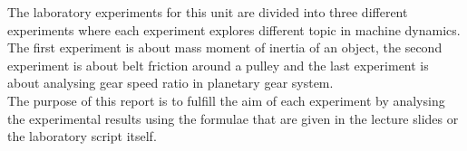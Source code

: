 The laboratory experiments for this unit are divided into three different experiments where each experiment explores different topic in machine dynamics. The first experiment is about mass moment of inertia of an object, the second experiment is about belt friction around a pulley and the last experiment is about analysing gear speed ratio in planetary gear system. \\

The purpose of this report is to fulfill the aim of each experiment by analysing the experimental results using the formulae that are given in the lecture slides or the laboratory script itself.